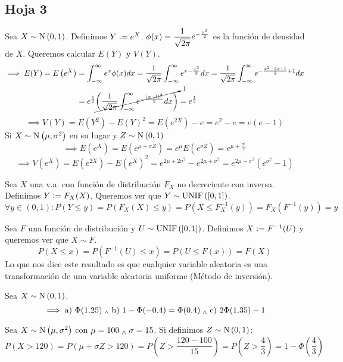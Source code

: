 \subsection{Hoja 3}

 Sea $X\sim\operatorname{N}\left(0,1\right)$. Definimos $Y\vcentcolon= e^X$. $\displaystyle\phi(x) = \frac{1}{\sqrt{2\pi}}e^{-\frac{x^2}{2}}$ es la función de densidad de $X$. Queremos calcular $E(Y)$ y $V(Y)$.
\[\begin{aligned}
		\implies E(Y) = E\left(e^X\right) & = \int_{-\infty}^{\infty} e^x\phi(x)dx = \frac{1}{\sqrt{2\pi}} \int_{-\infty}^{\infty} e^{x-\frac{x^2}{2}}dx = \frac{1}{\sqrt{2\pi}}\int_{-\infty}^{\infty} e^{-\frac{x^2-2x+1}{2}+1}dx \\
		                                  & = e^{\frac{1}{2}} \cancelto{1}{\left(\frac{1}{\sqrt{2\pi}} \int_{-\infty}^{\infty} e^{-\frac{(x-1)^2}{2}}dx \right)} = e^{\frac{1}{2}}
	\end{aligned}\]
\[\implies V(Y) = E(Y^2) - E(Y)^2 = E(e^{2X}) - e = e^2 - e = e(e-1)\]
Si $X\sim\operatorname{N}\left(\mu, \sigma^2\right)$ en su lugar y $Z\sim\operatorname{N}\left(0,1\right)$
\[\implies E(e^X) = E\left(e^{\mu+\sigma Z} \right) = e^{\mu}E\left(e^{\sigma Z}\right) = e^{\mu+\frac{\sigma^2}{2}}\]
\[\implies V\left(e^X\right) = E\left(e^{2X}\right) - E\left(e^X\right)^2 = e^{2\mu + 2\sigma^2} - e^{2\mu + \sigma^2} = e^{2\mu + \sigma^2}\left(e^{\sigma^2} - 1\right)\]

 Sea $X$ una v.a. con función de distribución $F_X$ no decreciente con inversa. Definimos $Y \vcentcolon= F_X(X)$. Queremos ver que $Y\sim\operatorname{UNIF}\left([0,1]\right)$.
\[\forall y \in (0, 1) : P(Y \leq y) = P(F_X(X) \leq y) = P(X \leq F_X^{-1} (y)) = F_X(F^{-1} (y)) = y\]

 Sea $F$ una función de distribución y $U\sim\operatorname{UNIF}\left([0, 1]\right)$. Definimos $X \vcentcolon= F^{-1}(U)$ y queremos ver que $X\sim F$.
\[P(X \leq x) = P(F^{-1}(U) \leq x) = P(U \leq F(x)) = F(X)\]
Lo que nos dice este resultado es que cualquier variable aleatoria es una transformación de una variable aleatoria uniforme (Método de inversión).

 Sea $X\sim\operatorname{N}\left(0,1\right)$.
\[\implies \text{a) }\Phi(1.25) \; _{\wedge} \; \text{b) }1-\Phi(-0.4) = \Phi(0.4) \; _{\wedge} \; \text{c) } 2\Phi(1.35) - 1\]

 Sea $X\sim\operatorname{N}\left(\mu, \sigma^2\right)$ con $\mu = 100 \; _{\wedge} \; \sigma = 15$. Si definimos $Z\sim\operatorname{N}\left(0,1\right)$:
\[P(X > 120) = P(\mu + \sigma Z > 120) = P\left(Z > \frac{120-100}{15}\right) = P\left(Z > \frac{4}{3}\right) = 1 - \Phi\left(\frac{4}{3}\right)\]

